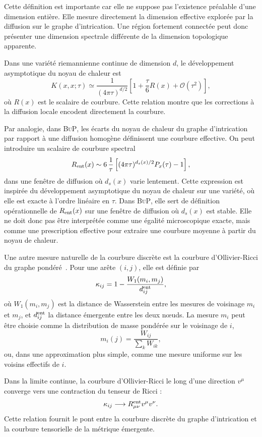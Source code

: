 \documentclass[11pt]{article}
\newcommand{\BuP}{\textsc{BuP}}
\begin{document}
Cette d\'efinition est importante car elle ne suppose pas l'existence pr\'ealable
d'une dimension enti\`ere. Elle mesure directement la dimension effective explor\'ee
par la diffusion sur le graphe d'intrication. Une r\'egion fortement connect\'ee peut
donc pr\'esenter une dimension spectrale diff\'erente de la dimension topologique
apparente.

Dans une vari\'et\'e riemannienne continue de dimension $d$, le d\'eveloppement
asymptotique du noyau de chaleur est
\[
K(x,x;\tau)
\simeq
\frac{1}{(4\pi\tau)^{d/2}}
\left[
1+\frac{\tau}{6}R(x)+\mathcal{O}(\tau^2)
\right],
\]
o\`u $R(x)$ est le scalaire de courbure. Cette relation montre que les corrections
\`a la diffusion locale encodent directement la courbure.

Par analogie, dans \BuP, les \'ecarts du noyau de chaleur du graphe d'intrication
par rapport \`a une diffusion homog\`ene d\'efinissent une courbure effective. On peut
introduire un scalaire de courbure spectral
\[
R_{\rm ent}(x)
\sim
6\,
\frac{1}{\tau}
\left[
(4\pi\tau)^{d_s(x)/2}P_x(\tau)-1
\right],
\]
dans une fen\^etre de diffusion o\`u $d_s(x)$ varie lentement. Cette expression est
inspir\'ee du d\'eveloppement asymptotique du noyau de chaleur sur une vari\'et\'e,
o\`u elle est exacte \`a l'ordre lin\'eaire en $\tau$. Dans \BuP, elle sert de
d\'efinition op\'erationnelle de $R_{\rm ent}(x)$ sur une fen\^etre de diffusion o\`u
$d_s(x)$ est stable. Elle ne doit donc pas \^etre interpr\'et\'ee comme une \'egalit\'e
microscopique exacte, mais comme une prescription effective pour extraire une
courbure moyenne \`a partir du noyau de chaleur.

Une autre mesure naturelle de la courbure discr\`ete est la courbure d'Ollivier-Ricci
du graphe pond\'er\'e~\cite{ollivier2009}. Pour une ar\^ete $(i,j)$, elle est d\'efinie par
\[
\kappa_{ij}
=
1
-
\frac{W_1(m_i,m_j)}{d_{ij}^{\rm ent}},
\]
o\`u $W_1(m_i,m_j)$ est la distance de Wasserstein entre les mesures de voisinage
$m_i$ et $m_j$, et $d_{ij}^{\rm ent}$ la distance \'emergente entre les deux n\oe{}uds.
La mesure $m_i$ peut \^etre choisie comme la distribution de masse pond\'er\'ee sur le
voisinage de $i$,
\[
m_i(j)
=
\frac{W_{ij}}{\sum_k W_{ik}},
\]
ou, dans une approximation plus simple, comme une mesure uniforme sur les voisins
effectifs de $i$.

Dans la limite continue, la courbure d'Ollivier-Ricci le long d'une direction $v^\mu$
converge vers une contraction du tenseur de Ricci :
\[
\kappa_{ij}
\longrightarrow
R_{\mu\nu}^{\rm ent}v^\mu v^\nu.
\]
Cette relation fournit le pont entre la courbure discr\`ete du graphe d'intrication
et la courbure tensorielle de la m\'etrique \'emergente.
\end{document}

